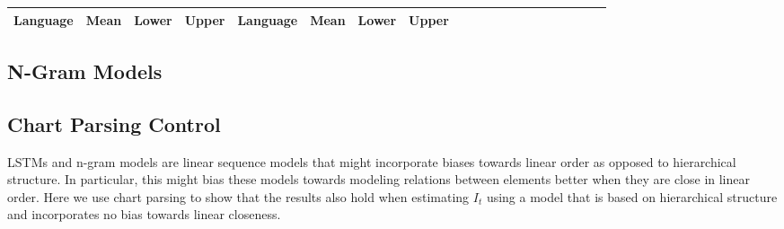 \documentclass[11pt,letterpaper]{article}
\begin{document}
\begin{center}
\begin{longtable}{l|lll||l|lllllllllllllll}
	Language & Mean & Lower & Upper & Language & Mean & Lower & Upper \\ \hline

\end{longtable}
	\label{tab:boot-g}
\end{center}




\subsection{N-Gram Models}






%
%
%
%
%
%

\subsection{Chart Parsing Control}

LSTMs and n-gram models are linear sequence models that might incorporate biases towards linear order as opposed to hierarchical structure.
In particular, this might bias these models towards modeling relations between elements better when they are close in linear order.
Here we use chart parsing to show that the results also hold when estimating $I_t$ using a model that is based on hierarchical structure and incorporates no bias towards linear closeness.
\end{document}
